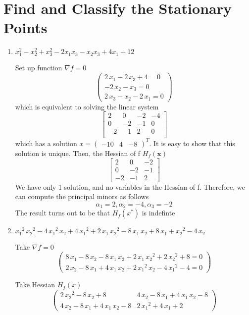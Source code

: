  




\section{Find and Classify the Stationary Points}
\begin{enumerate}
\item $x_1^2-x_2^2+x_3^2-2x_1x_3-x_2x_3+4x_1+12$\par
Set up function $\nabla f=0$
\[
\left(\begin{array}{c}
2\,x_1 -2\,x_3 +4=0\\
-2\,x_2 -x_3=0\\
2\,x_3 -x_2 -2\,x_1=0 
\end{array}\right)
\]
which is equivalent to solving the linear system
\[
\left[
\begin{array}{ccc|c}
2 & 0 & -2  & -4 \\
0 & -2 & -1  & 0 \\
-2 & -1 & 2  & 0 \\
\end{array}
\right]
\]
which has a solution $x = \begin{pmatrix}-10 & 4 & -8\end{pmatrix}^T$. It is easy to show that this solution is unique. Then, the Hessian of f $H_f(\mathbf{x})$
\[
\left[\begin{array}{ccc}
2 & 0 & -2\\
0 & -2 & -1\\
-2 & -1 & 2
\end{array}\right]
\]
We have only 1 solution, and no variables in the Hessian of f. Therefore, we can compute the principal minors as follows
$$\alpha_1 = 2, \alpha_2 = -4, \alpha_3=-2$$
The result turns out to be that $H_f(x^*)$ is indefinte

\item ${x_1 }^2 \,{x_2 }^2 -4\,{x_1 }^2 \,x_2 +4\,{x_1 }^2 +2\,x_1 \,{x_2 }^2 -8\,x_1 \,x_2 +8\,x_1 +{x_2 }^2 -4\,x_2$\par
Take $\nabla f=0$
\[
\left(\begin{array}{c}
8\,x_1 -8\,x_2 -8\,x_1 \,x_2 +2\,x_1 \,{x_2 }^2 +2\,{x_2 }^2 +8=0\\
2\,x_2 -8\,x_1 +4\,x_1 \,x_2 +2\,{x_1 }^2 \,x_2 -4\,{x_1 }^2 -4=0
\end{array}\right)
\]
\par Take Hessian $H_f(x)$
\[
\left(\begin{array}{cc}
2\,{x_2 }^2 -8\,x_2 +8 & 4\,x_2 -8\,x_1 +4\,x_1 \,x_2 -8\\
4\,x_2 -8\,x_1 +4\,x_1 \,x_2 -8 & 2\,{x_1 }^2 +4\,x_1 +2
\end{array}\right)
\]


\end{enumerate}
